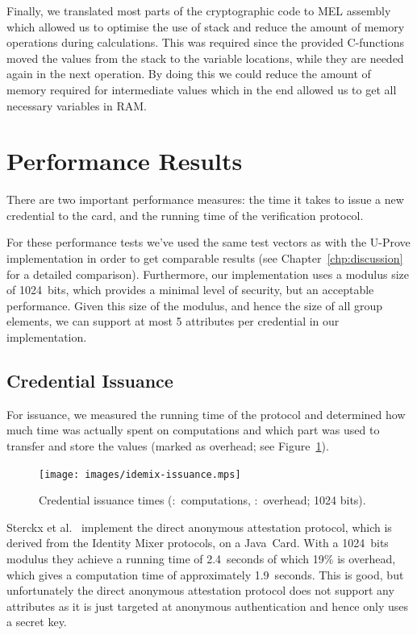 Finally, we translated most parts of the cryptographic code to MEL assembly
which allowed us to optimise the use of stack and reduce the amount of memory
operations during calculations. This was required since the provided C-functions
moved the values from the stack to the variable locations, while they are needed
again in the next operation. By doing this we could reduce the amount of memory
required for intermediate values which in the end allowed us to get all
necessary variables in RAM.

\section{Performance Results\label{sec:IM-performance}}

There are two important performance measures: the time it takes to issue a new
credential to the card, and the running time of the verification protocol.

For these performance tests we've used the same test vectors as with the U-Prove
implementation in order to get comparable results (see
Chapter~\ref{chp:discussion} for a detailed comparison). Furthermore, our
implementation uses a modulus size of 1024~bits, which provides a minimal level
of security, but an acceptable performance. Given this size of the modulus, and
hence the size of all group elements, we can support at most 5 attributes per
credential in our implementation.

\subsection{Credential Issuance}

For issuance, we measured the running time of the protocol and determined how
much time was actually spent on computations and which part was used to transfer
and store the values (marked as overhead; see Figure~\ref{fig:issuance}).

\begin{figure}[b]
  \centering
  \texttt{[image: images/idemix-issuance.mps]}

  \caption[Credential issuance times.]{
    Credential issuance times
    (:~computations,
      :~overhead; 1024 bits).}
  \label{fig:issuance}
\end{figure}

Sterckx et al.~\cite{Sterckx09} implement the direct anonymous attestation
protocol, which is derived from the Identity Mixer protocols, on a Java~Card.
With a 1024~bits modulus they achieve a running time of 2.4~seconds of which
19\% is overhead, which gives a computation time of approximately 1.9~seconds.
This is good, but unfortunately the direct anonymous attestation protocol does
not support any attributes as it is just targeted at anonymous authentication
and hence only uses a secret key.

